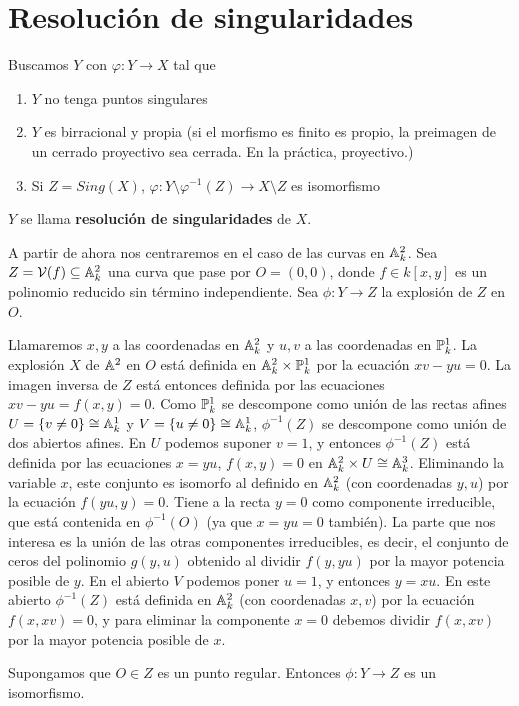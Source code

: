 \documentclass[ACGA.tex]{subfiles}
\begin{document}
\section{Resolución de singularidades}

Buscamos $Y$ con $\varphi:Y\to X$ tal que 
\begin{enumerate}
\item $Y$ no tenga puntos singulares
\item $Y$ es birracional y propia (si el morfismo es finito es propio, la preimagen de un cerrado proyectivo sea cerrada. En la práctica, proyectivo.)
\item Si $Z=Sing(X)$, $\varphi:Y\setminus\varphi^{-1}(Z)\to X\setminus Z$ es isomorfismo
\end{enumerate}
$Y$ se llama \textbf{resolución de singularidades} de $X$.


A partir de ahora nos centraremos en el caso de las curvas en $\mathbb{A}^2_k$. Sea $Z=\mathcal{V}(f)\subseteq\mathbb{A}^2_k$ una curva que pase por $O=(0,0)$, donde $f\in k[x,y]$ es un polinomio reducido sin término independiente. Sea $\phi:Y\to Z$ la explosión de $Z$ en $O$. 

Llamaremos $x,y$ a las coordenadas en $\mathbb{A}^2_k$ y $u,v$ a las coordenadas en $\mathbb{P}^1_k$. La explosión $X$ de $\mathbb{A}^2$ en $O$ está definida en $\mathbb{A}^2_k\times\mathbb{P}^1_k$ por la ecuación $xv-yu=0$. La imagen inversa de $Z$ está entonces definida por las ecuaciones $xv-yu=f(x,y)=0$. Como $\mathbb{P}^1_k$ se descompone como unión de las rectas afines $U=\{v\neq 0\}\cong\mathbb{A}^1_k$ y $V=\{u\neq 0\}\cong\mathbb{A}^1_k$, $\phi^{-1}(Z)$ se descompone como unión de dos abiertos afines. En $U$ podemos suponer $v=1$, y entonces $\phi^{-1}(Z)$ está definida por las ecuaciones $x=yu$, $f(x,y)=0$ en $\mathbb{A}^2_k\times U\cong\mathbb{A}^3_k$. Eliminando la variable $x$, este conjunto es isomorfo al definido en $\mathbb{A}^2_k$ (con coordenadas $y,u$) por la ecuación $f(yu,y)=0$. Tiene a la recta $y=0$ como componente irreducible, que está contenida en $\phi^{-1}(O)$ (ya que $x=yu=0$ también). La parte que nos interesa es la unión de las otras componentes irreducibles, es decir, el conjunto de ceros del polinomio $g(y,u)$ obtenido al dividir $f(y,yu)$ por la mayor potencia posible de $y$.
 En el abierto $V$ podemos poner $u=1$, y entonces $y=xu$. En este abierto $\phi^{-1}(Z)$ está definida en $\mathbb{A}^2_k$ (con coordenadas $x,v$) por la ecuación $f(x,xv)=0$, y para eliminar la componente $x=0$ debemos dividir $f(x,xv)$ por la mayor potencia posible de $x$. 

\begin{prop}
 Supongamos que $O\in Z$ es un punto regular. Entonces $\phi:Y\to Z$ es un isomorfismo.
\end{prop}
\end{document}
